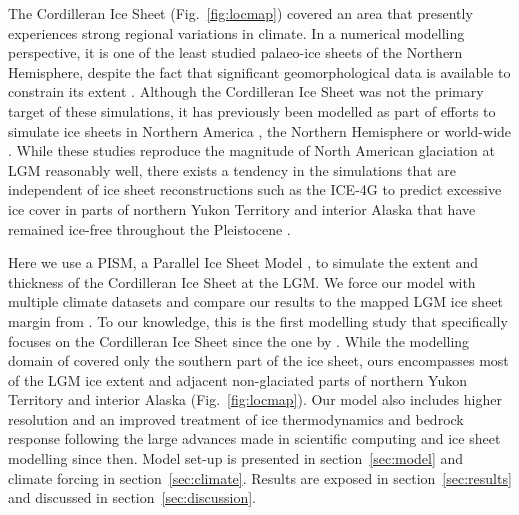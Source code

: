 The Cordilleran Ice Sheet (Fig.~\ref{fig:locmap}) covered an area that presently experiences strong regional variations in climate. In a numerical modelling perspective, it is one of the least studied palaeo-ice sheets of the Northern Hemisphere, despite the fact that significant geomorphological data is available to constrain its extent \citep{jackson-clague-1991,dukrodkin-1999,kaufman-manley-2004,kleman-etal-2010,margold-etal-2011}. Although the Cordilleran Ice Sheet was not the primary target of these simulations, it has previously been modelled as part of efforts to simulate ice sheets in Northern America \citep{marshall-clarke-1999,calov-etal-2002,tarasov-peltier-1997,tarasov-peltier-2004,gregoire-etal-2012}, the Northern Hemisphere \citep{huybrechts-tsiobbel-1996,greve-etal-1999,charbit-etal-2002,charbit-etal-2007,charbit-etal-2013,johnson-fastook-2002,rodgers-etal-2004,bintanja-etal-2005,zweck-huybrechts-2005,abeouchi-etal-2007} or world-wide \citep{yoshimori-etal-2001}. While these studies reproduce the magnitude of North American glaciation at LGM reasonably well, there exists a tendency in the simulations that are independent of ice sheet reconstructions such as the ICE-4G to predict excessive ice cover in parts of northern Yukon Territory and interior Alaska that have remained ice-free throughout the Pleistocene \citep{dukrodkin-1999,kaufman-manley-2004}.

Here we use a PISM, a Parallel Ice Sheet Model \citep{web:pism}, to simulate the extent and thickness of the Cordilleran Ice Sheet at the LGM. We force our model with multiple climate datasets and compare our results to the mapped LGM ice sheet margin from \citet{dyke-2004}. To our knowledge, this is the first modelling study that specifically focuses on the Cordilleran Ice Sheet since the one by \citet{robert-1991}. While the modelling domain of \citet{robert-1991} covered only the southern part of the ice sheet, ours encompasses most of the LGM ice extent and adjacent non-glaciated parts of northern Yukon Territory and interior Alaska (Fig.~\ref{fig:locmap}). Our model also includes higher resolution and an improved treatment of ice thermodynamics and bedrock response following the large advances made in scientific computing and ice sheet modelling since then. Model set-up is presented in section~\ref{sec:model} and climate forcing in section~\ref{sec:climate}. Results are exposed in section~\ref{sec:results} and discussed in section~\ref{sec:discussion}.
